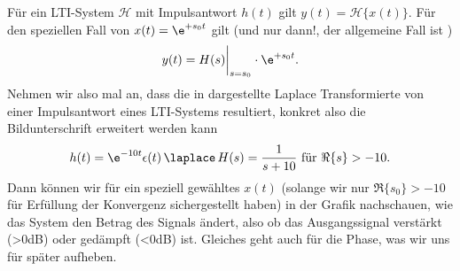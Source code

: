 \begin{Loesung}
Für ein LTI-System $\mathcal{H}$ mit Impulsantwort $h(t)$ gilt
$y(t) = \mathcal{H}\{x(t)\}$.
Für den speziellen Fall von $x(t)=\e^{+s_0 t}$ gilt (und nur dann!,
der allgemeine Fall ist )
\begin{equation}
y(t) = H(s)\bigg|_{s=s_0} \cdot \e^{+s_0 t}.
\end{equation}
%
Nehmen wir also mal an, dass die in 
dargestellte Laplace Transformierte von einer Impulsantwort eines LTI-Systems resultiert,
konkret also die Bildunterschrift erweitert werden kann
\begin{equation}
\label{eq_31AEFEF90B_LaplaceExample_hH}
h(t) = \e^{-10 t} \epsilon(t) \, \laplace \, H(s) = \frac{1}{s+10}\text{ für }\Re\{s\} > -10.
\end{equation}
Dann können wir für ein speziell gewähltes $x(t)$ (solange wir nur $\Re\{s_0\} > -10$
für Erfüllung der Konvergenz sichergestellt haben) in der Grafik 
nachschauen, wie das System den Betrag des Signals ändert, also ob das Ausgangssignal
verstärkt (>0dB) oder gedämpft (<0dB) ist. Gleiches geht auch für die Phase, was
wir uns für später aufheben.


\end{Loesung}



